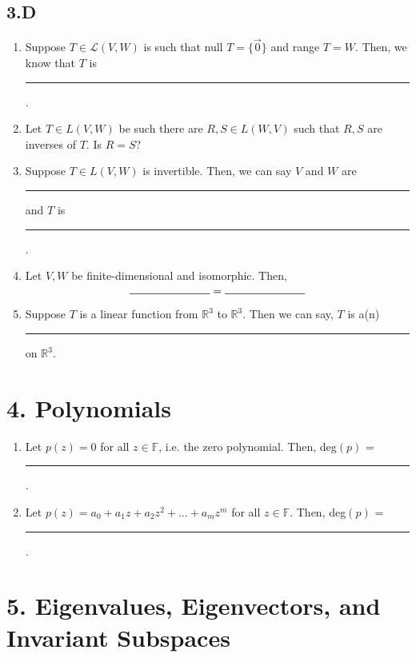 \documentclass[11pt]{article}
\begin{document}
\subsection*{3.D}
\begin{enumerate}
	\item Suppose $T \in \mathcal{L}(V, W)$ is such that null $T = \{\vec{0}\}$ and range $T = W$. Then, we know that $T$ is \rule[0ex]{1in}{0.5pt}.
	
	\item Let $T \in L(V, W)$ be such there are $R, S \in L(W, V)$ such that $R, S$ are inverses of $T$. Is $R = S$?
	
	\item Suppose $T \in L(V, W)$ is invertible. Then, we can say $V$ and $W$ are \rule[0ex]{1in}{0.5pt} and $T$ is \rule[0ex]{1in}{0.5pt}.
	
	\item Let $V, W$ be finite-dimensional and isomorphic. Then,
	\[\rule[0ex]{1in}{0.5pt} = \rule[0ex]{1in}{0.5pt} \]
	
	\item Suppose $T$ is a linear function from $\mathbb{R}^3$ to $\mathbb{R}^3$. Then we can say, $T$ is a(n) \rule[0ex]{2in}{0.5pt} on $\mathbb{R}^3$.
\end{enumerate}

\section*{4. Polynomials}
\begin{enumerate}
	\item Let $p(z) = 0$ for all $z \in \mathbb{F}$, i.e. the zero polynomial. Then, deg$(p)$ = \rule[0ex]{0.5in}{0.5pt}.
	\item Let $p(z) = a_0 + a_1z + a_2z^2 + ... + a_mz^m$ for all $z \in \mathbb{F}$. Then, deg$(p)$ = \rule[0ex]{0.5in}{0.5pt}.
\end{enumerate}

\section*{5. Eigenvalues, Eigenvectors, and Invariant Subspaces}
\end{document}
